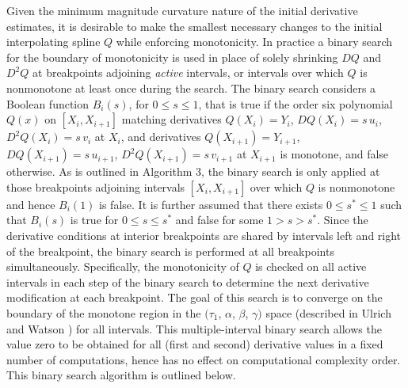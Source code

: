 Given the minimum magnitude curvature nature of the initial derivative
estimates, it is desirable to make the smallest necessary changes to
the initial interpolating spline $Q$ while enforcing monotonicity. In
practice a binary search for the boundary of monotonicity is used in
place of solely shrinking $DQ$ and $D^2Q$ at breakpoints adjoining
{\it active\/} intervals, or intervals over which $Q$ is nonmonotone at
least once during the search. The binary search considers a Boolean
function $B_i(s)$, for $0 \le s \le 1$, that is true if the order six
polynomial $Q(x)$ on $[X_i, X_{i+1}]$ matching derivatives
$Q(X_i)=Y_i$, $DQ(X_i)=s \,u_i$, $D^2Q(X_i)=s \,v_i$ at $X_i$, and derivatives
$Q(X_{i+1})=Y_{i+1}$, $DQ(X_{i+1})=s \,u_{i+1}$, $D^2Q(X_{i+1})=s \,v_{i+1}$
at $X_{i+1}$ is monotone, and false otherwise. As is outlined in Algorithm
3, the binary search is only applied at those breakpoints adjoining intervals
$[X_i, X_{i+1}]$ over which $Q$ is nonmonotone and hence $B_i(1)$ is false.
It is further assumed that there exists $0 \le s^* \le 1$ such that $B_i(s)$
is true for $0 \le s \le s^*$ and false for some $1 > s > s^*$. Since the
derivative conditions at interior breakpoints are shared by intervals left
 and right of the breakpoint, the binary search is performed at all
breakpoints simultaneously.  Specifically, the monotonicity of $Q$ is
checked on all active intervals in each step of the binary search to
determine the next derivative modification at each breakpoint. The goal
of this search is to converge on the boundary of the monotone region in
the $(\tau_1$, $\alpha$, $\beta$, $\gamma)$ space (described in Ulrich and
Watson \cite{ulrich1994positivity}) for all intervals. This multiple-interval binary search
allows the value zero to be obtained for all (first and second) derivative
values in a fixed number of computations, hence has no effect on
computational complexity order. This binary search algorithm is outlined
below.


